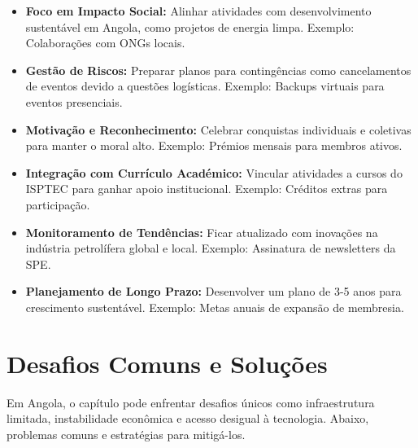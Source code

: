 \documentclass[12pt]{article}
\begin{document}
\begin{itemize}
    \item \textbf{Foco em Impacto Social:} Alinhar atividades com desenvolvimento sustentável em Angola, como projetos de energia limpa. Exemplo: Colaborações com ONGs locais.
    \item \textbf{Gestão de Riscos:} Preparar planos para contingências como cancelamentos de eventos devido a questões logísticas. Exemplo: Backups virtuais para eventos presenciais.
    \item \textbf{Motivação e Reconhecimento:} Celebrar conquistas individuais e coletivas para manter o moral alto. Exemplo: Prémios mensais para membros ativos.
    \item \textbf{Integração com Currículo Académico:} Vincular atividades a cursos do ISPTEC para ganhar apoio institucional. Exemplo: Créditos extras para participação.
    \item \textbf{Monitoramento de Tendências:} Ficar atualizado com inovações na indústria petrolífera global e local. Exemplo: Assinatura de newsletters da SPE.
    \item \textbf{Planejamento de Longo Prazo:} Desenvolver um plano de 3-5 anos para crescimento sustentável. Exemplo: Metas anuais de expansão de membresia.
\end{itemize}

\section{Desafios Comuns e Soluções}

Em Angola, o capítulo pode enfrentar desafios únicos como infraestrutura limitada, instabilidade econômica e acesso desigual à tecnologia. Abaixo, problemas comuns e estratégias para mitigá-los.
\end{document}
